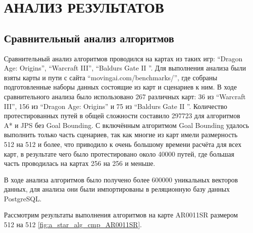 \section[Анализ результатов]{\MakeTextUppercase{АНАЛИЗ РЕЗУЛЬТАТОВ}}

\subsection{Сравнительный анализ алгоритмов}

Сравнительный анализ алгоритмов проводился на картах из таких игр: ``Dragon Age: Origins'', ``Warcraft III'', ``Baldurs Gate II ''. Для выполнения анализа были взяты карты и пути с сайта ``movingai.com/benchmarks/'', где собраны подготовленные наборы данных состоящие из карт и сценариев к ним. В ходе сравнительного анализа было использовано 267 различных карт: 36 из ``Warcraft III'', 156 из ``Dragon Age: Origins'' и 75 из ``Baldurs Gate II ''. Количество протестированных путей в общей сложности составило 297723 для алгоритмов A* и JPS без Goal Bounding. С включённым алгоритмом Goal Bounding удалось выполнить только часть сценариев, так как многие из карт имели размерность 512 на 512 и более, что приводило к очень большому времени расчёта для всех карт, в результате чего было протестировано около 40000 путей, где большая часть проводилась на картах 256 на 256 и меньше.

В ходе анализа алгоритмов было получено более 600000 уникальных векторов данных, для анализа они были импортированы в реляционную базу данных PostgreSQL.

Рассмотрим результаты выполнения алгоритмов на карте AR0011SR размером 512 на 512 \cref{fig:a_star_alg_cmp_AR0011SR}.

